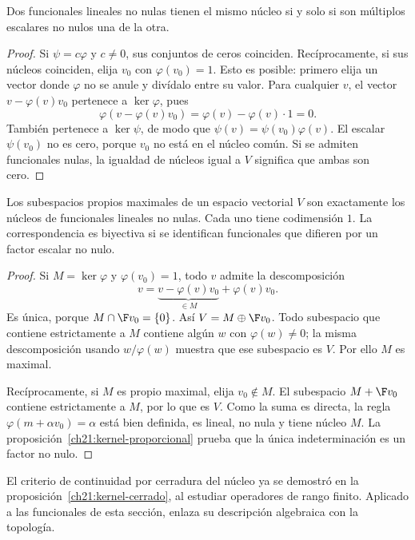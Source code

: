 \begin{proposicion}\label{ch21:kernel-proporcional}
Dos funcionales lineales no nulas tienen el mismo núcleo si y solo si son múltiplos escalares no nulos una de la otra.
\end{proposicion}
\begin{proof}
Si $\psi=c\varphi$ y $c\ne0$, sus conjuntos de ceros coinciden. Recíprocamente, si sus núcleos coinciden, elija $v_0$ con $\varphi(v_0)=1$. Esto es posible: primero elija un vector donde $\varphi$ no se anule y divídalo entre su valor. Para cualquier $v$, el vector $v-\varphi(v)v_0$ pertenece a $\ker\varphi$, pues
\[
 \varphi(v-\varphi(v)v_0)=\varphi(v)-\varphi(v)\cdot1=0.
\]
También pertenece a $\ker\psi$, de modo que $\psi(v)=\psi(v_0)\varphi(v)$. El escalar $\psi(v_0)$ no es cero, porque $v_0$ no está en el núcleo común. Si se admiten funcionales nulas, la igualdad de núcleos igual a $V$ significa que ambas son cero.
\end{proof}

\begin{teorema}\label{ch21:hiperplanos}
Los subespacios propios maximales de un espacio vectorial $V$ son exactamente los núcleos de funcionales lineales no nulas. Cada uno tiene codimensión $1$. La correspondencia es biyectiva si se identifican funcionales que difieren por un factor escalar no nulo.
\end{teorema}
\begin{proof}
Si $M=\ker\varphi$ y $\varphi(v_0)=1$, todo $v$ admite la descomposición
\[
 v=\underbrace{v-\varphi(v)v_0}_{\in M}+\varphi(v)v_0.
\]
Es única, porque $M\cap\F v_0=\{0\}$. Así $V=M\oplus\F v_0$. Todo subespacio que contiene estrictamente a $M$ contiene algún $w$ con $\varphi(w)\ne0$; la misma descomposición usando $w/\varphi(w)$ muestra que ese subespacio es $V$. Por ello $M$ es maximal.

Recíprocamente, si $M$ es propio maximal, elija $v_0\notin M$. El subespacio $M+\F v_0$ contiene estrictamente a $M$, por lo que es $V$. Como la suma es directa, la regla $\varphi(m+\alpha v_0)=\alpha$ está bien definida, es lineal, no nula y tiene núcleo $M$. La proposición~\ref{ch21:kernel-proporcional} prueba que la única indeterminación es un factor no nulo.
\end{proof}

El criterio de continuidad por cerradura del núcleo ya se demostró en la proposición~\ref{ch21:kernel-cerrado}, al estudiar operadores de rango finito. Aplicado a las funcionales de esta sección, enlaza su descripción algebraica con la topología.

